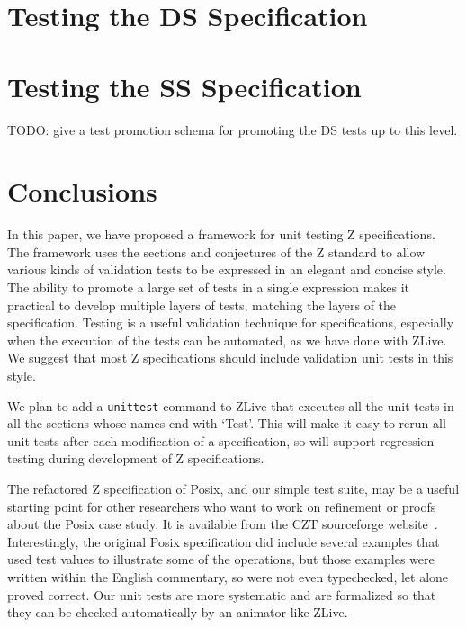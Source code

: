 \documentclass{llncs}
\begin{document}


\section{Testing the DS Specification}\label{sect:ds}




\section{Testing the SS Specification}\label{sect:ss}

TODO: give a test promotion schema for promoting the DS tests up to this
level.


\section{Conclusions}\label{sect:conclusions}

In this paper, we have proposed a framework for unit testing Z
specifications.  The framework uses the sections and conjectures of
the Z standard to allow various kinds of validation tests to be
expressed in an elegant and concise style.  The ability to promote a
large set of tests in a single expression makes it practical to
develop multiple layers of tests, matching the layers of the
specification.  Testing is a useful validation technique for
specifications, especially when the execution of the tests can be
automated, as we have done with ZLive.  We suggest that most Z
specifications should include validation unit tests in this style.

We plan to add a \texttt{unittest} command to ZLive that executes all the
unit tests in all the sections whose names end with `Test'.  This will
make it easy to rerun all unit tests after each modification of a
specification, so will support regression testing during development
of Z specifications.

The refactored Z specification of Posix, and our simple test suite,
may be a useful starting point for other researchers who want to work
on refinement or proofs about the Posix case study.  It is available
from the CZT sourceforge website~\cite{CZT}.  Interestingly, the
original Posix specification did include several examples that used
test values to illustrate some of the operations, but those examples
were written within the English commentary, so were not even
typechecked, let alone proved correct.  Our unit tests are more
systematic and are formalized so that they can be checked
automatically by an animator like ZLive.


%
%


%
\end{document}
